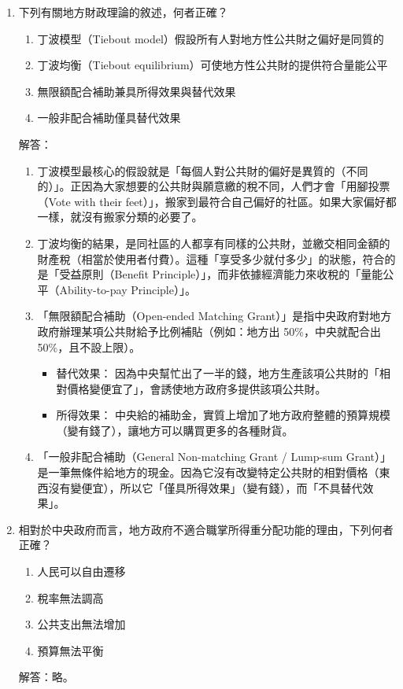 \documentclass[12pt, a4paper]{article}
\begin{document}
\begin{enumerate}
    \item 下列有關地方財政理論的敘述，何者正確？
    \begin{enumerate}[label=\Alph*.]
        \item 丁波模型（Tiebout model）假設所有人對地方性公共財之偏好是同質的
        \item 丁波均衡（Tiebout equilibrium）可使地方性公共財的提供符合量能公平
        \item 無限額配合補助兼具所得效果與替代效果
        \item 一般非配合補助僅具替代效果
    \end{enumerate}
    解答：
    \begin{enumerate}[label=\Alph*.]
        \item 丁波模型最核心的假設就是「每個人對公共財的偏好是異質的（不同的）」。正因為大家想要的公共財與願意繳的稅不同，人們才會「用腳投票（Vote with their feet）」，搬家到最符合自己偏好的社區。如果大家偏好都一樣，就沒有搬家分類的必要了。
        \item 丁波均衡的結果，是同社區的人都享有同樣的公共財，並繳交相同金額的財產稅（相當於使用者付費）。這種「享受多少就付多少」的狀態，符合的是「受益原則（Benefit Principle）」，而非依據經濟能力來收稅的「量能公平（Ability-to-pay Principle）」。
        \item 「無限額配合補助（Open-ended Matching Grant）」是指中央政府對地方政府辦理某項公共財給予比例補貼（例如：地方出 50\%，中央就配合出 50\%，且不設上限）。
        \begin{itemize}
            \item 替代效果： 因為中央幫忙出了一半的錢，地方生產該項公共財的「相對價格變便宜了」，會誘使地方政府多提供該項公共財。
            \item 所得效果： 中央給的補助金，實質上增加了地方政府整體的預算規模（變有錢了），讓地方可以購買更多的各種財貨。
        \end{itemize}
        \item 「一般非配合補助（General Non-matching Grant / Lump-sum Grant）」是一筆無條件給地方的現金。因為它沒有改變特定公共財的相對價格（東西沒有變便宜），所以它「僅具所得效果」（變有錢），而「不具替代效果」。
    \end{enumerate}

    \item 相對於中央政府而言，地方政府不適合職掌所得重分配功能的理由，下列何者正確？
    \begin{enumerate}[label=\Alph*.]
        \item 人民可以自由遷移
        \item 稅率無法調高
        \item 公共支出無法增加
        \item 預算無法平衡
    \end{enumerate}
    解答：略。


\end{enumerate}
\end{document}
